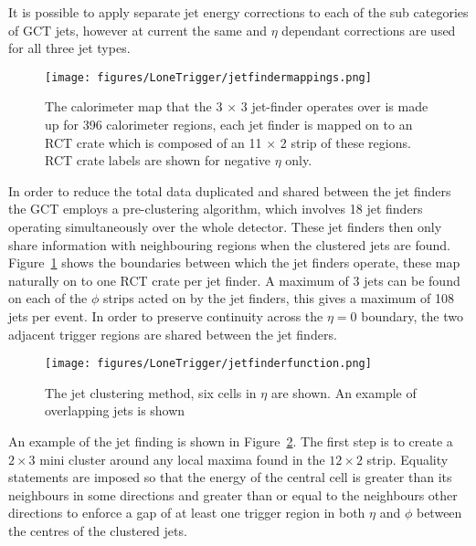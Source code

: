 It is possible to apply separate jet energy corrections to each of the sub 
categories of GCT jets, however at current the same \ET and $\eta$ dependant 
corrections are used for all three jet types.

\begin{figure}[ht]
  \centering    
  \texttt{[image: figures/LoneTrigger/jetfindermappings.png]}
  \caption{The calorimeter map that the 3 $\times$ 3 jet-finder operates over
   is made up for 396 calorimeter regions, each jet finder is mapped on to an 
   RCT crate which is composed of an 11 $\times$ 2 strip of these regions. RCT
   crate labels are shown for negative $\eta$ only. }
  \label{fig:figures_LoneTrigger_jetfindermappings}
\end{figure}

In order to reduce the total data duplicated and shared between the jet finders
the GCT employs a pre-clustering algorithm, which involves 18 jet finders 
operating simultaneously over the whole detector. These jet finders then only
share information with neighbouring regions when the clustered jets are found.
Figure~\ref{fig:figures_LoneTrigger_jetfindermappings} shows the boundaries 
between which the jet finders operate, these map naturally on to one RCT crate 
per jet finder. A maximum of 3 jets can be found on each of the $\phi$ strips
acted on by the jet finders, this gives a maximum of 108 jets per event. In
order to preserve continuity across the $\eta = 0$ boundary, the two adjacent
trigger regions are shared between the jet finders.


\begin{figure}[ht]
  \centering
 \texttt{[image: figures/LoneTrigger/jetfinderfunction.png]}
  \caption{The \Lone jet clustering method, six cells in $\eta$ are shown. An
  example of overlapping jets is shown}
  \label{fig:figures_LoneTrigger_jetfinderfunction}
\end{figure}


An example of the jet finding is shown in
Figure~\ref{fig:figures_LoneTrigger_jetfinderfunction}. The first step is to 
create a $2 \times 3$ mini cluster around any local maxima found in the $12 
\times 2$ strip. Equality statements are imposed so that the energy of the 
central cell is greater than its neighbours in some directions and greater than 
or equal to the neighbours other directions to enforce a gap of at least one 
trigger region in both $\eta$ and $\phi$ between the centres of the clustered 
jets.


